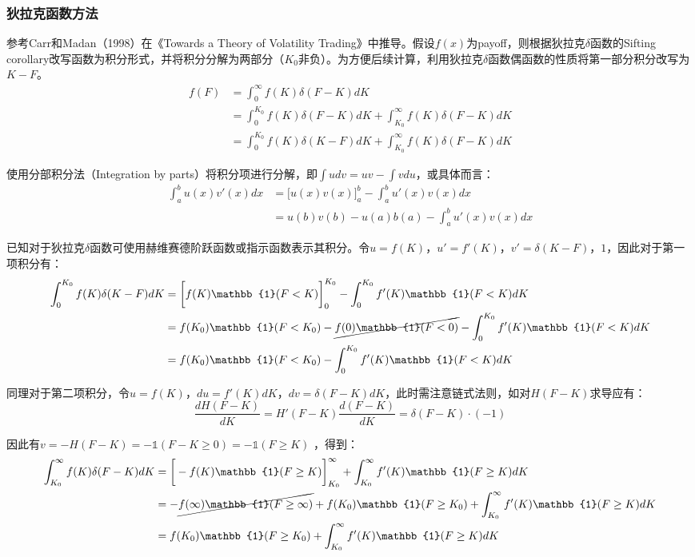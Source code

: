 \documentclass[11pt]{article}
\begin{document}
\subsubsection{狄拉克\tops{$\delta$}函数方法}

参考Carr和Madan（1998）在《Towards a Theory of Volatility Trading》中推导。假设$f(x)$为payoff，则根据狄拉克$\delta$函数的Sifting corollary改写函数为积分形式，并将积分分解为两部分（$K_0$非负）。为方便后续计算，利用狄拉克$\delta$函数偶函数的性质将第一部分积分改写为$K-F$。
\begin{align*}
    f(F) &= \int^{\infty}_{0}f(K)\delta(F-K)dK \\
    &= \int^{K_0}_{0}f(K)\delta(F-K)dK + \int^{\infty}_{K_0}f(K)\delta(F-K)dK \\
    &= \int^{K_0}_{0}f(K)\delta(K-F)dK + \int^{\infty}_{K_0}f(K)\delta(F-K)dK
\end{align*}

使用分部积分法（Integration by parts）将积分项进行分解，即$\int u dv = uv - \int v du$，或具体而言：
\begin{align*}
    \int^b_a u(x) v'(x) dx &= \bigg[ u(x) v(x) \bigg]^b_a - \int^b_a u'(x)v(x) dx \\
    &= u(b)v(b) - u(a)b(a) - \int^b_a u'(x)v(x) dx
\end{align*}

已知对于狄拉克$\delta$函数可使用赫维赛德阶跃函数或指示函数表示其积分。令$u=f(K)$，$u'=f'(K)$，$v'=\delta(K-F)$，$1$，因此对于第一项积分有：
\begin{align*}
    \int^{K_0}_{0}f(K)\delta(K-F)dK 
    &= \bigg[ f(K) \mathbb{1}(F<K) \bigg]^{K_0}_{0} - \int^{K_0}_{0} f'(K) \mathbb{1}(F<K) dK \\ 
    &= f(K_0) \mathbb{1}(F<K_0) - \cancel{f(0)\mathbb{1}(F<0)} - \int^{K_0}_{0} f'(K) \mathbb{1}(F<K) dK \\
    &= f(K_0)\mathbb{1}(F<K_0) - \int^{K_0}_{0} f'(K) \mathbb{1}(F<K) dK
\end{align*}

同理对于第二项积分，令$u=f(K)$，$du = f'(K)dK$，$dv=\delta(F-K)dK$，此时需注意链式法则，如对$H(F-K)$求导应有：
\begin{equation*}
    \frac{dH(F-K)}{dK} = H'(F-K) \frac{d(F-K)}{dK} = \delta(F-K)\cdot(-1)
\end{equation*}

因此有$v=-H(F-K)=-\mathbb{1}(F -K \geq 0)=-\mathbb{1}(F \geq K)$ ，得到：
\begin{align*}
    \int^{\infty}_{K_0} f(K)\delta(F-K)dK 
    &= \bigg[ - f(K) \mathbb{1}(F \geq K) \bigg]^{\infty}_{K_0} + \int^{\infty}_{K_0} f'(K) \mathbb{1}(F \geq K) dK \\
    &= - \cancel{f(\infty) \mathbb{1}(F\geq \infty)} + f(K_0) \mathbb{1}(F\geq K_0 ) + \int^{\infty}_{K_0} f'(K) \mathbb{1}(F \geq K) dK \\
    &= f(K_0) \mathbb{1}(F\geq K_0 ) + \int^{\infty}_{K_0} f'(K) \mathbb{1}(F \geq K) dK
\end{align*}
\end{document}
